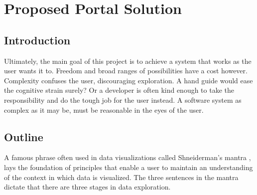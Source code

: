 \graphicspath{{Chapter5/Figs/Vector/}{Chapter5/Figs/}}

%
\chapter{Proposed Portal Solution}

%
\section{Introduction}
Ultimately, the main goal of this project is to achieve a system that works as the user wants it to. Freedom and broad ranges of possibilities have a cost however. Complexity confuses the user, discouraging exploration. A hand guide would ease the cognitive strain surely? Or a developer is often kind enough to take the responsibility and do the tough job for the user instead. A software system as complex as it may be, must be reasonable in the eyes of the user.

%
%
\section{Outline}
A famous phrase often used in data visualizations called Shneiderman's mantra \cite{mantra}, lays the foundation of principles that enable a user to maintain an understanding of the context in which data is visualized. The three sentences in the mantra dictate that there are three stages in data exploration.

